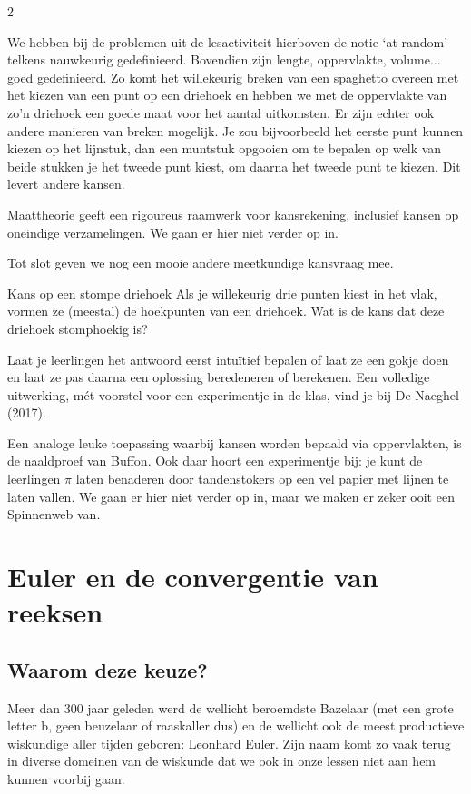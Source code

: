 	
\begin{multicols}{2}
	
We hebben bij de problemen uit de lesactiviteit hierboven de notie `at random' telkens nauwkeurig gedefinieerd. Bovendien zijn lengte, oppervlakte, volume$\ldots$ goed gedefinieerd. Zo komt het willekeurig breken van een spaghetto overeen met het kiezen van een punt op een driehoek en hebben we met de oppervlakte van zo'n driehoek een goede maat voor het aantal uitkomsten. Er zijn echter ook andere manieren van breken mogelijk. Je zou bijvoorbeeld het eerste punt kunnen kiezen op het lijnstuk, dan een muntstuk opgooien om te bepalen op welk van beide stukken je het tweede punt kiest, om daarna het tweede punt te kiezen. Dit levert andere kansen. 

Maattheorie geeft een rigoureus raamwerk voor kansrekening, inclusief kansen op oneindige verzamelingen. We gaan er hier niet verder op in.

Tot slot geven we nog een mooie andere meetkundige kansvraag mee.

\begin{kader}{}{Kans op een stompe driehoek}
Als je willekeurig drie punten kiest in het vlak, vormen ze (meestal) de hoekpunten van een driehoek. Wat is de kans dat deze driehoek stomphoekig is?
\end{kader}

Laat je leerlingen het antwoord eerst intuïtief bepalen of laat ze een gokje doen en laat ze pas daarna een oplossing beredeneren of berekenen. Een volledige uitwerking, mét voorstel voor een experimentje in de klas, vind je bij De Naeghel (2017).

Een analoge leuke toepassing waarbij kansen worden bepaald via oppervlakten, is de naaldproef van Buffon. Ook daar hoort een experimentje bij: je kunt de leerlingen $\pi$ laten benaderen door tandenstokers op een vel papier met lijnen te laten vallen. We gaan er hier niet verder op in, maar we maken er zeker ooit een Spinnenweb van.

	\section{Euler en de convergentie van reeksen}
	
	\subsection*{Waarom deze keuze?}
	
	Meer dan 300 jaar geleden werd de wellicht beroemdste Bazelaar (met een grote letter b, geen beuzelaar of raaskaller dus) en de wellicht ook de meest productieve wiskundige aller tijden geboren: Leonhard Euler. Zijn naam komt zo vaak terug in diverse domeinen van de wiskunde dat we ook in onze lessen niet aan hem kunnen voorbij gaan.
	

\end{multicols}
